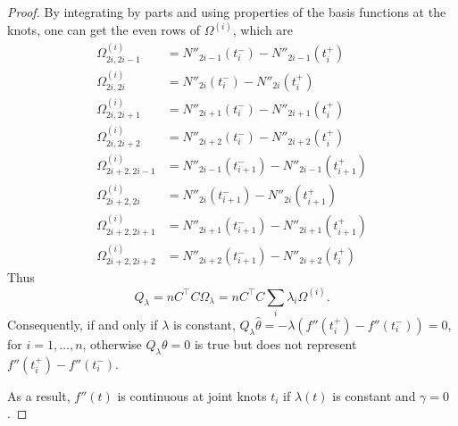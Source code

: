 \begin{proof}
By integrating by parts and using properties of the basis functions at the knots, one can get the even rows of $\Omega^{(i)}$, which are 
\begin{align*}
\Omega^{(i)}_{2i,2i-1}&=N''_{2i-1}\left(t_i^-\right) - N''_{2i-1}\left(t_i^+\right)  \\
\Omega^{(i)}_{2i,2i}   &=N''_{2i}\left(t_i^-\right) - N''_{2i}\left(t_i^+\right)  \\
\Omega^{(i)}_{2i,2i+1}&=N''_{2i+1}\left(t_i^-\right) - N''_{2i+1}\left(t_i^+\right) \\
\Omega^{(i)}_{2i,2i+2}&=N''_{2i+2}\left(t_i^-\right) - N''_{2i+2}\left(t_i^+\right) \\
\Omega^{(i)}_{2i+2,2i-1}&=N''_{2i-1}\left(t_{i+1}^-\right) - N''_{2i-1}\left( t_{i+1}^+ \right) \\
\Omega^{(i)}_{2i+2,2i}&=N''_{2i}\left(t_{i+1}^-\right) - N''_{2i}\left(t_{i+1}^+\right) \\
\Omega^{(i)}_{2i+2,2i+1}&=N''_{2i+1}\left(t_{i+1}^-\right) - N''_{2i+1}\left(t_{i+1}^+\right) \\
\Omega^{(i)}_{2i+2,2i+2}&=N''_{2i+2}\left(t_{i+1}^-\right) - N''_{2i+2}\left(t_i^+\right) 
\end{align*}
Thus 
\begin{equation*}
Q_\lambda = nC^\top C\Omega_\lambda = nC^\top C\sum_i\lambda_i \Omega^{(i)}.
\end{equation*}
Consequently, if and only if $\lambda$ is constant, $Q_\lambda\hat{\theta}=-\lambda\left( f''\left(t_i^+\right)-f''\left(t_i^-\right) \right)=0$, for $i=1,\ldots,n$, otherwise $Q_\lambda\theta=0$ is true but does not represent $f''\left(t_i^+\right)-f''\left(t_i^-\right)$. 

As a result, $f''(t)$ is continuous at joint knots $t_i$ if $\lambda(t)$ is constant and $\gamma=0$. 


\end{proof}




